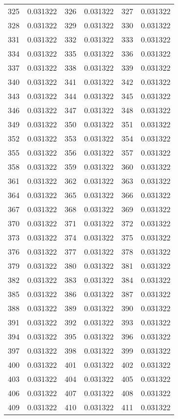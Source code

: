 \documentclass[12pt]{article}
\begin{document}
\begin{longtable}{@{}cc|cc|cc@{}}
325 & 0.031322 & 326 & 0.031322 & 327 & 0.031322 \\
328 & 0.031322 & 329 & 0.031322 & 330 & 0.031322 \\
331 & 0.031322 & 332 & 0.031322 & 333 & 0.031322 \\
334 & 0.031322 & 335 & 0.031322 & 336 & 0.031322 \\
337 & 0.031322 & 338 & 0.031322 & 339 & 0.031322 \\
340 & 0.031322 & 341 & 0.031322 & 342 & 0.031322 \\
343 & 0.031322 & 344 & 0.031322 & 345 & 0.031322 \\
346 & 0.031322 & 347 & 0.031322 & 348 & 0.031322 \\
349 & 0.031322 & 350 & 0.031322 & 351 & 0.031322 \\
352 & 0.031322 & 353 & 0.031322 & 354 & 0.031322 \\
355 & 0.031322 & 356 & 0.031322 & 357 & 0.031322 \\
358 & 0.031322 & 359 & 0.031322 & 360 & 0.031322 \\
361 & 0.031322 & 362 & 0.031322 & 363 & 0.031322 \\
364 & 0.031322 & 365 & 0.031322 & 366 & 0.031322 \\
367 & 0.031322 & 368 & 0.031322 & 369 & 0.031322 \\
370 & 0.031322 & 371 & 0.031322 & 372 & 0.031322 \\
373 & 0.031322 & 374 & 0.031322 & 375 & 0.031322 \\
376 & 0.031322 & 377 & 0.031322 & 378 & 0.031322 \\
379 & 0.031322 & 380 & 0.031322 & 381 & 0.031322 \\
382 & 0.031322 & 383 & 0.031322 & 384 & 0.031322 \\
385 & 0.031322 & 386 & 0.031322 & 387 & 0.031322 \\
388 & 0.031322 & 389 & 0.031322 & 390 & 0.031322 \\
391 & 0.031322 & 392 & 0.031322 & 393 & 0.031322 \\
394 & 0.031322 & 395 & 0.031322 & 396 & 0.031322 \\
397 & 0.031322 & 398 & 0.031322 & 399 & 0.031322 \\
400 & 0.031322 & 401 & 0.031322 & 402 & 0.031322 \\
403 & 0.031322 & 404 & 0.031322 & 405 & 0.031322 \\
406 & 0.031322 & 407 & 0.031322 & 408 & 0.031322 \\
409 & 0.031322 & 410 & 0.031322 & 411 & 0.031322 \\

\end{longtable}
\end{document}
